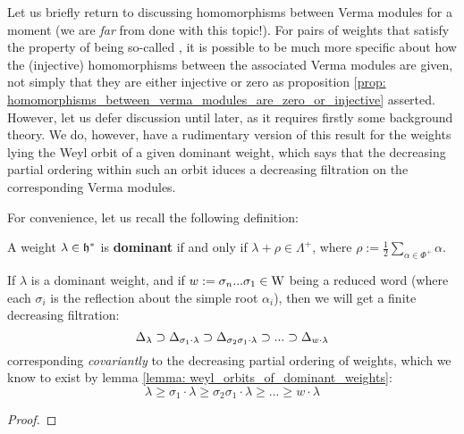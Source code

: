         Let us briefly return to discussing homomorphisms between Verma modules for a moment (we are \textit{far} from done with this topic!). For pairs of weights that satisfy the property of being so-called , it is possible to be much more specific about how the (injective) homomorphisms between the associated Verma modules are given, not simply that they are either injective or zero as proposition \ref{prop: homomorphisms_between_verma_modules_are_zero_or_injective} asserted. However, let us defer discussion until later, as it requires firstly some background theory. We do, however, have a rudimentary version of this result for the weights lying the Weyl orbit of a given dominant weight, which says that the decreasing partial ordering within such an orbit iduces a decreasing filtration on the corresponding Verma modules.
        
        For convenience, let us recall the following definition:
        \begin{definition} \label{def: dominant_weights}
            A weight $\lambda \in \mathfrak{h}^*$ is \textbf{dominant} if and only if $\lambda + \rho \in \Lambda^+$, where $\rho := \frac12 \sum_{\alpha \in \Phi^+} \alpha$.
        \end{definition}
        \begin{remark}
            
        \end{remark}
        \begin{lemma} \label{lemma: weyl_orbits_of_dominant_weights}
            \cite[Lemma 13.2A]{humphreys_lie_algebras}
        \end{lemma}
        \begin{theorem} \label{theorem: weyl_filtrations_for_dominant_verma_modules}
            If $\lambda$ is a dominant weight, and if $w := \sigma_n ... \sigma_1 \in \mathrm{W}$ being a reduced word (where each $\sigma_i$ is the reflection about the simple root $\alpha_i$), then we will get a finite decreasing filtration:
                $$\Delta_{\lambda} \supset \Delta_{\sigma_1 \cdot \lambda} \supset \Delta_{\sigma_2 \sigma_1 \cdot \lambda} \supset ... \supset \Delta_{w \cdot \lambda}$$
            corresponding \textit{covariantly} to the decreasing partial ordering of weights, which we know to exist by lemma \ref{lemma: weyl_orbits_of_dominant_weights}:
                $$\lambda \geq \sigma_1 \cdot \lambda \geq \sigma_2 \sigma_1 \cdot \lambda \geq ... \geq w \cdot \lambda$$
        \end{theorem}
            \begin{proof}
                
            \end{proof} 

